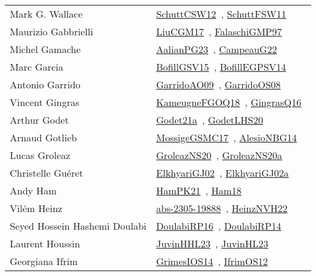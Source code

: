{\begin{longtable}{p{4cm}p{20cm}}
Mark G. Wallace & \href{papers/SchuttCSW12.pdf}{SchuttCSW12}~\cite{SchuttCSW12}, \href{articles/SchuttFSW11.pdf}{SchuttFSW11}~\cite{SchuttFSW11}\\
Maurizio Gabbrielli & \href{papers/LiuCGM17.pdf}{LiuCGM17}~\cite{LiuCGM17}, \href{articles/FalaschiGMP97.pdf}{FalaschiGMP97}~\cite{FalaschiGMP97}\\
Michel Gamache & \href{papers/AalianPG23.pdf}{AalianPG23}~\cite{AalianPG23}, \href{articles/CampeauG22.pdf}{CampeauG22}~\cite{CampeauG22}\\
Marc Garcia & \href{papers/BofillGSV15.pdf}{BofillGSV15}~\cite{BofillGSV15}, \href{papers/BofillEGPSV14.pdf}{BofillEGPSV14}~\cite{BofillEGPSV14}\\
Antonio Garrido & \href{articles/GarridoAO09.pdf}{GarridoAO09}~\cite{GarridoAO09}, \href{articles/GarridoOS08.pdf}{GarridoOS08}~\cite{GarridoOS08}\\
Vincent Gingras & \href{papers/KameugneFGOQ18.pdf}{KameugneFGOQ18}~\cite{KameugneFGOQ18}, \href{papers/GingrasQ16.pdf}{GingrasQ16}~\cite{GingrasQ16}\\
Arthur Godet & \href{}{Godet21a}~\cite{Godet21a}, \href{papers/GodetLHS20.pdf}{GodetLHS20}~\cite{GodetLHS20}\\
Arnaud Gotlieb & \href{papers/MossigeGSMC17.pdf}{MossigeGSMC17}~\cite{MossigeGSMC17}, \href{papers/AlesioNBG14.pdf}{AlesioNBG14}~\cite{AlesioNBG14}\\
Lucas Groleaz & \href{papers/GroleazNS20.pdf}{GroleazNS20}~\cite{GroleazNS20}, \href{papers/GroleazNS20a.pdf}{GroleazNS20a}~\cite{GroleazNS20a}\\
Christelle Gu{\'{e}}ret & \href{papers/ElkhyariGJ02.pdf}{ElkhyariGJ02}~\cite{ElkhyariGJ02}, \href{papers/ElkhyariGJ02a.pdf}{ElkhyariGJ02a}~\cite{ElkhyariGJ02a}\\
Andy Ham & \href{articles/HamPK21.pdf}{HamPK21}~\cite{HamPK21}, \href{}{Ham18}~\cite{Ham18}\\
Vil{\'{e}}m Heinz & \href{articles/abs-2305-19888.pdf}{abs-2305-19888}~\cite{abs-2305-19888}, \href{articles/HeinzNVH22.pdf}{HeinzNVH22}~\cite{HeinzNVH22}\\
Seyed Hossein Hashemi Doulabi & \href{}{DoulabiRP16}~\cite{DoulabiRP16}, \href{papers/DoulabiRP14.pdf}{DoulabiRP14}~\cite{DoulabiRP14}\\
Laurent Houssin & \href{papers/JuvinHHL23.pdf}{JuvinHHL23}~\cite{JuvinHHL23}, \href{papers/JuvinHL23.pdf}{JuvinHL23}~\cite{JuvinHL23}\\
Georgiana Ifrim & \href{articles/GrimesIOS14.pdf}{GrimesIOS14}~\cite{GrimesIOS14}, \href{papers/IfrimOS12.pdf}{IfrimOS12}~\cite{IfrimOS12}\\

\end{longtable}}
